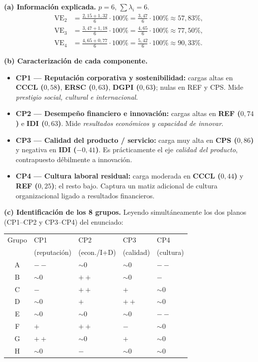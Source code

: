 \documentclass[11pt,a4paper]{article}
\begin{document}
\begin{solbox}
\textbf{(a) Información explicada.} $p=6$, $\sum\lambda_i = 6$.
\begin{align*}
\mathrm{VE}_2 &= \frac{2{,}15+1{,}32}{6}\cdot 100\% = \frac{3{,}47}{6}\cdot 100\% \approx \boxed{57{,}83\%},\\
\mathrm{VE}_3 &= \frac{3{,}47+1{,}18}{6}\cdot 100\% = \frac{4{,}65}{6}\cdot 100\% \approx \boxed{77{,}50\%},\\
\mathrm{VE}_4 &= \frac{4{,}65+0{,}77}{6}\cdot 100\% = \frac{5{,}42}{6}\cdot 100\% \approx \boxed{90{,}33\%}.
\end{align*}

\textbf{(b) Caracterización de cada componente.}
\begin{itemize}[noitemsep,leftmargin=*]
\item \textbf{CP1 — Reputación corporativa y sostenibilidad:} cargas altas en \textbf{CCCL ($0{,}58$)}, \textbf{ERSC ($0{,}63$)}, \textbf{DGPI ($0{,}63$)}; nulas en REF y CPS. Mide \emph{prestigio social, cultural e internacional}.
\item \textbf{CP2 — Desempeño financiero e innovación:} cargas altas en \textbf{REF ($0{,}74$)} e \textbf{IDI ($0{,}63$)}. Mide \emph{resultados económicos y capacidad de innovar}.
\item \textbf{CP3 — Calidad del producto / servicio:} carga muy alta en \textbf{CPS ($0{,}86$)} y negativa en \textbf{IDI ($-0{,}41$)}. Es prácticamente el eje \emph{calidad del producto}, contrapuesto débilmente a innovación.
\item \textbf{CP4 — Cultura laboral residual:} carga moderada en \textbf{CCCL ($0{,}44$)} y \textbf{REF ($0{,}25$)}; el resto bajo. Captura un matiz adicional de cultura organizacional ligado a resultados financieros.
\end{itemize}

\textbf{(c) Identificación de los 8 grupos.} Leyendo simultáneamente los dos planos (CP1--CP2 y CP3--CP4) del enunciado:

\begin{center}\small
\begin{tabular}{cllll}\toprule
Grupo & CP1 & CP2 & CP3 & CP4 \\
      & (reputación) & (econ./I+D) & (calidad) & (cultura)\\\midrule
A & $-{}-$ & $\sim 0$ & $\sim 0$ & $-{}-$ \\
B & $\sim 0$ & $+{}+$  & $\sim 0$ & $-$\\
C & $-$ & $+{}+$  & $+$ & $\sim 0$\\
D & $\sim 0$ & $+$ & $+{}+$ & $\sim 0$\\
E & $\sim 0$ & $\sim 0$ & $\sim 0$ & $-{}-$\\
F & $+$  & $+{}+$  & $-$ & $\sim 0$\\
G & $+{}+$ & $\sim 0$ & $+$ & $\sim 0$\\
H & $\sim 0$ & $-$  & $\sim 0$ & $\sim 0$\\\bottomrule
\end{tabular}\end{center}


\end{solbox}
\end{document}
